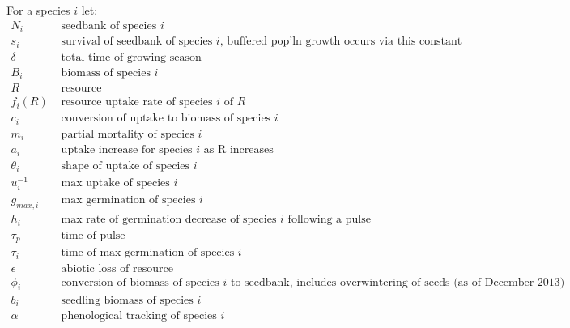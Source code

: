 \documentclass[11pt,a4paper,oneside]{article}
\begin{document}
\noindent For a species \(i\) let:
\begin{align*}
N_{i} & \text{   seedbank of species } i
\\
s_{i} & \text{   survival of seedbank of species } i \text{, buffered pop'ln
  growth occurs via this constant}
\\
\delta & \text{   total time of growing season}
\\
B_{i} &  \text{   biomass of species } i
\\
R &   \text{   resource}
\\
f_{i}(R) & \text{  resource uptake rate of species } i \text{ of } R
\\
c_{i} & \text{   conversion of uptake to biomass of species } i
\\
m_{i} & \text{   partial mortality of species } i
\\
a_{i} & \text{   uptake increase for species } i \text{ as R increases}
\\
\theta_{i} & \text{   shape of uptake of species } i
\\
u_{i}^{-1} & \text{   max uptake of species } i
\\
g_{max,i} & \text{   max germination of species } i
\\
h_{i} & \text{   max rate of germination decrease of species } i
\text{ following a pulse}
\\
\tau_{p} & \text{   time of pulse }
\\
\tau_{i} & \text{   time of max germination of species } i
\\
\epsilon & \text{   abiotic loss of resource}
\\
\phi_{i} & \text{   conversion of biomass of species } i \text{ to
  seedbank, includes overwintering of seeds (as of December 2013)}
\\
b_{i} & \text{   seedling biomass of species } i
\\
\alpha & \text{   phenological tracking of species  } i
\\
\end{align*}

\newpage 
\end{document}
